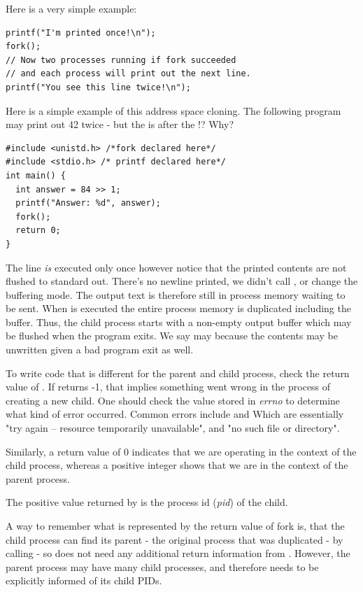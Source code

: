 Here is a very simple example:

\begin{verbatim}
printf("I'm printed once!\n");
fork();
// Now two processes running if fork succeeded
// and each process will print out the next line.
printf("You see this line twice!\n");
\end{verbatim}

Here is a simple example of this address space cloning.
The following program may print out 42 twice - but the  is after the !? Why?

\begin{verbatim}
#include <unistd.h> /*fork declared here*/
#include <stdio.h> /* printf declared here*/
int main() {
  int answer = 84 >> 1;
  printf("Answer: %d", answer);
  fork();
  return 0;
}
\end{verbatim}

The  line \emph{is} executed only once however notice that the printed contents are not flushed to standard out.
There's no newline printed, we didn't call , or change the buffering mode.
The output text is therefore still in process memory waiting to be sent.
When  is executed the entire process memory is duplicated including the buffer.
Thus, the child process starts with a non-empty output buffer which may be flushed when the program exits.
We say may because the contents may be unwritten given a bad program exit as well.

To write code that is different for the parent and child process, check the return value of .
If  returns -1, that implies something went wrong in the process of creating a new child.
One should check the value stored in \emph{errno} to determine what kind of error occurred.
Common errors include  and  Which are essentially "try again -- resource temporarily unavailable", and "no such file or directory".

Similarly, a return value of 0 indicates that we are operating in the context of the child process, whereas a positive integer shows that we are in the context of the parent process.

The positive value returned by  is the process id (\emph{pid}) of the child.

A way to remember what is represented by the return value of fork is, that the child process can find its parent - the original process that was duplicated - by calling  - so does not need any additional return information from . However, the parent process may have many child processes, and therefore needs to be explicitly informed of its child PIDs.

